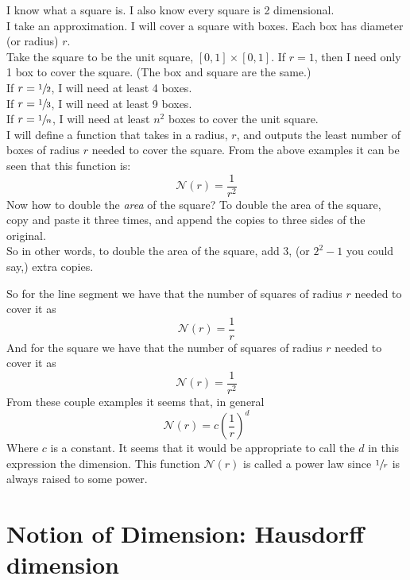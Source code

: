 \documentclass[11pt]{ekblite}
\begin{document}
\begin{example}[Square]
	I know what a square is. I also know every square is 2 dimensional.
	\\[0.2in]I take an approximation. I will cover a square with boxes. Each box has diameter (or radius) $r$.
	\\[0.2in]Take the square to be the unit square, $[0,1] \times [0,1]$. If $r = 1$, then I need only 1 box to cover the square. (The box and square are the same.)
	\\[0.2in]If $r = \sfrac{1}{2}$, I will need at least 4 boxes.
	\\[0.2in]If $r = \sfrac{1}{3}$, I will need at least 9 boxes.
	\\[0.2in]If $r = \sfrac{1}{n}$, I will need at least $n^2$ boxes to cover the unit square.
	\\[0.2in]I will define a function that takes in a radius, $r$, and outputs the least number of boxes of radius $r$ needed to cover the square. From the above examples it can be seen that this function is:
	\[\mathcal{N}(r) = \frac{1}{r^2}\]
	Now how to double the \textit{area} of the square? To double the area of the square, copy and paste it three times, and append the copies to three sides of the original. 
	\\[0.2in]So in other words, to double the area of the square, add 3, (or $2^2 - 1$ you could say,) extra copies.
\end{example}
So for the line segment we have that the number of squares of radius $r$ needed to cover it as
\[\mathcal{N}(r) = \frac{1}{r}\]
And for the square we have that the number of squares of radius $r$ needed to cover it as
\[\mathcal{N}(r) = \frac{1}{r^2}\]
From these couple examples it seems that, in general
\[\mathcal{N}(r) = c \left(\frac{1}{r}\right)^d\]
Where $c$ is a constant. It seems that it would be appropriate to call the $d$ in this expression the dimension. This function $\mathcal{N}(r)$ is called a power law since $\sfrac{1}{r}$ is always raised to some power. \cite{falconer2}

\newpage
\section{Notion of Dimension: Hausdorff dimension}
\newpage
\end{document}

